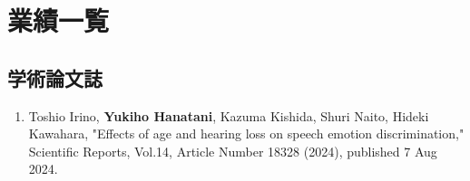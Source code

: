 \documentclass[11pt]{jreport}
\begin{document}
\newpage
\section*{業績一覧}
\subsection*{学術論文誌}
 \begin{enumerate}

    \item  Toshio Irino, \textbf{Yukiho Hanatani}, Kazuma Kishida, Shuri Naito, Hideki Kawahara,
     "Effects of age and hearing loss on speech emotion discrimination," Scientific Reports, 
     Vol.14, Article Number 18328 (2024), published 7 Aug 2024.

\end{enumerate}

\end{document}
